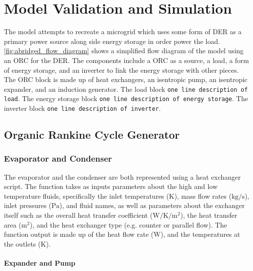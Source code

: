 \chapter{Model Validation and Simulation}
\label{ch:model}

The model attempts to recreate a microgrid which uses some form of DER as a primary power source along side energy storage in order power the load. \autoref{fig:abridged_flow_diagram} shows a simplified flow diagram of the model using an ORC for the DER. The components include a ORC as a source, a load, a form of energy storage, and an inverter to link the energy storage with other pieces. The ORC block is made up of heat exchangers, an isentropic pump, an isentropic expander, and an induction generator. The load block \verb|one line description of load|. The energy storage block \verb|one line description of energy storage|. The inverter block \verb|one line description of inverter|.



\section{Organic Rankine Cycle Generator}

\subsection{Evaporator and Condenser}
The evaporator and the condenser are both represented using a heat exchanger script.  The function takes as inputs parameters about the high and low temperature fluids, specifically the inlet temperatures ($\si{\kelvin}$), mass flow rates ($\si{\kilogram\per\second} $), inlet pressures ($\si{\pascal}$), and fluid names, as well as parameters about the exchanger itself such as the overall heat transfer coefficient ($\si{\watt\per\kelvin\per\meter\squared}$), the heat transfer area ($\si{\meter\squared}$), and the heat exchanger type (e.g. counter or parallel flow). The function output is made up of the heat flow rate ($\si{\watt}$), and the temperatures at the outlets ($\si{\kelvin}$).



\subsubsection{Expander and Pump}